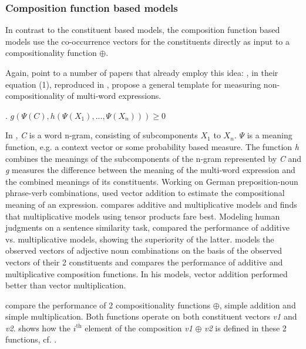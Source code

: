 \subsubsection{Composition function based models}
In contrast to the constituent based models, the composition function
based models use the co-occurrence vectors for the constituents
directly as input to a compositionality function $\oplus$.



Again, \citet{Reddyetal:2011} point to a number of papers that already
employ this idea: \citet{SchoneandJurafsky:2001}, in their equation (1), reproduced in \Next, propose a
general template for measuring non-compositionality of multi-word
expressions.

\ex.  \( \displaystyle g(\Psi (C) , h( \Psi (X_1 ),..., \Psi (X_n ) ) ) \ge 0 \)

In \Last, \emph{C} is a word n-gram, consisting of subcomponents $X_1$
to $X_n$. $\Psi$ is a meaning function, e.g. a context vector or
some probability based measure. The function
 \emph{h} combines the
meanings of the subcomponents of the n-gram represented by \emph{C} and
 \emph{g} measures the difference between the meaning of
the multi-word expression and the combined meanings of its
constituents. Working on German
preposition-noun phrase-verb
combinations, \citet{KatzandGiesbrecht:2006} used vector addition to estimate the compositional
meaning of an expression. 
\citet{Giesbrecht:2009} compares additive
and multiplicative models and finds that multiplicative models using tensor products
fare best. Modeling human judgments
on a sentence similarity task, \citet{MitchellandLapata:2008} compared the performance of additive
vs. multiplicative models, showing the superiority of the latter.
\citet{Guevara:2010} models the observed vectors
of adjective noun combinations on the basis of the observed vectors of their 2
constituents and compares the performance of additive and
multiplicative composition functions. 
In his models, vector addition
performed better than vector multiplication. 

\enlargethispage{1\baselineskip}
\citet{Reddyetal:2011} compare the performance of 2 compositionality
functions $\oplus$, simple addition and simple multiplication. Both
functions operate on both constituent vectors \emph{v1} and \emph{v2}.  \Next
shows how the $i^{\text{th}}$ element of the composition \emph{v1} $\oplus$
\emph{v2} is defined in these 2 functions, cf. \citet[216]{Reddyetal:2011}.   

